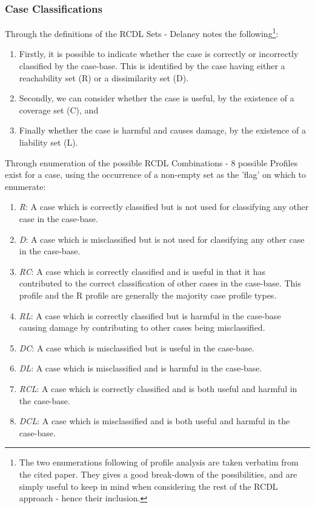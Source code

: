 \documentclass[a4paper,11pt]{report}
\begin{document}
\subsubsection{Case Classifications}
Through the definitions of the RCDL Sets - Delaney notes the following\cite{Delany2009}\footnote{The two enumerations following of profile analysis are taken verbatim from the cited paper. They gives a good break-down of the possibilities, and are simply useful to keep in mind when considering the rest of the RCDL approach - hence their inclusion.}:

\begin{enumerate}
	\item Firstly, it is possible to indicate whether the case is correctly or incorrectly classified by the case-base. This is identified by the case having either a reachability set (R) or a dissimilarity set (D).
	\item Secondly, we can consider whether the case is useful, by the existence of a coverage set (C), and
	\item Finally whether the case is harmful and causes damage, by the existence of a liability set (L).
\end{enumerate}

Through enumeration of the possible RCDL Combinations - 8 possible Profiles exist for a case, using the occurrence of a non-empty set as the 'flag' on which to enumerate\cite{Delany2009}:

\begin{enumerate}
	\item \emph{R}: A case which is correctly classified but is not used for classifying any other case in the case-base.
	\item \emph{D}: A case which is misclassified but is not used for classifying any other case in the case-base.
	\item \emph{RC}: A case which is correctly classified and is useful in that it has contributed to the correct classification of other cases in the case-base. This profile and the R profile are generally the majority case profile types.
	\item \emph{RL}: A case which is correctly classified but is harmful in the case-base causing damage by contributing to other cases being misclassified.
	\item \emph{DC}: A case which is misclassified but is useful in the case-base. 
	\item \emph{DL}: A case which is misclassified and is harmful in the case-base.
	\item \emph{RCL}: A case which is correctly classified and is both useful and harmful in the case-base.
	\item \emph{DCL}: A case which is misclassified and is both useful and harmful in the case-base.
\end{enumerate}
\end{document}
